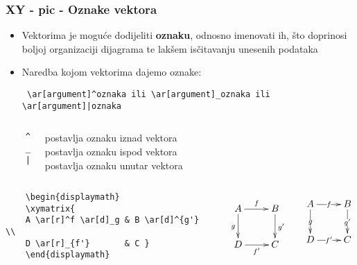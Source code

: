 \documentclass[9pt]{beamer}
\begin{document}
\begin{frame}[fragile]
\frametitle{XY - pic - Oznake vektora}

\begin{itemize}
	\item Vektorima je moguće dodijeliti \textbf{oznaku}, odnosno imenovati ih, što doprinosi boljoj organizaciji dijagrama te lakšem isčitavanju unesenih podataka
	\item Naredba kojom vektorima dajemo oznake: 
	\begin{verbatim} \ar[argument]^oznaka ili \ar[argument]_oznaka ili \ar[argument]|oznaka \end{verbatim}
\end{itemize}

\begin{columns}
	\begin{verbatim}
	^
	_
	|
	\end{verbatim}
	postavlja oznaku iznad vektora \\
	postavlja oznaku ispod vektora \\ 
	postavlja oznaku unutar vektora \\
\end{columns}

\end{frame}


\begin{frame}[fragile]

\begin{columns}
	\begin{verbatim}
	\begin{displaymath}
	\xymatrix{
	A \ar[r]^f \ar[d]_g & B \ar[d]^{g'} \\
	D \ar[r]_{f'}       & C }
	\end{displaymath}
	\end{verbatim}

	\begin{displaymath}
	\xymatrix{
		A \ar[r]^f \ar[d]_g & B \ar[d]^{g'} \\
		D \ar[r]_{f'}       & C }
	\end{displaymath}
	
	\begin{displaymath}
	\xymatrix{
		A \ar[r]|f \ar[d]|g & B \ar[d]|{g'} \\
		D \ar[r]|{f'}       & C }
	\end{displaymath}
\end{columns}

\end{frame}
\end{document}
